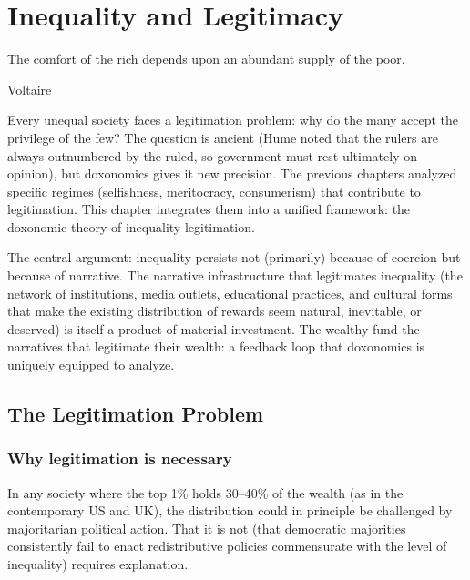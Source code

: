 \chapter{Inequality and Legitimacy}
\label{ch:inequality-legitimacy}

\epigraph{The comfort of the rich depends upon an abundant supply of the poor.}{Voltaire}

\noindent
Every unequal society faces a legitimation problem: why do the many accept the privilege of the few?
The question is ancient (Hume noted that the rulers are always outnumbered by the ruled, so government must rest ultimately on opinion), but doxonomics gives it new precision.
The previous chapters analyzed specific regimes (selfishness, meritocracy, consumerism) that contribute to legitimation.
This chapter integrates them into a unified framework: the doxonomic theory of inequality legitimation.

The central argument: inequality persists not (primarily) because of coercion but because of narrative.
The narrative infrastructure that legitimates inequality (the network of institutions, media outlets, educational practices, and cultural forms that make the existing distribution of rewards seem natural, inevitable, or deserved) is itself a product of material investment.
The wealthy fund the narratives that legitimate their wealth: a feedback loop that doxonomics is uniquely equipped to analyze.

\section{The Legitimation Problem}
\label{sec:ch24-problem}

\subsection{Why legitimation is necessary}

In any society where the top 1\% holds 30--40\% of the wealth (as in the contemporary US and UK), the distribution could in principle be challenged by majoritarian political action.
That it is not (that democratic majorities consistently fail to enact redistributive policies commensurate with the level of inequality) requires explanation.

